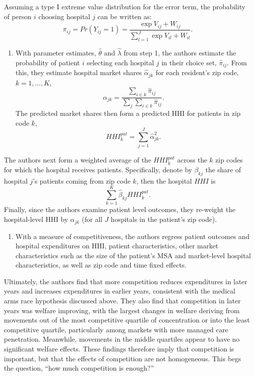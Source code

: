 \documentclass[
  letterpaper,
  DIV=11,
  numbers=noendperiod]{scrreport}
\providecommand{\tightlist}{%
  \setlength{\itemsep}{0pt}\setlength{\parskip}{0pt}}\usepackage{longtable,booktabs,array}
\theoremstyle{definition}
\theoremstyle{remark}
\begin{document}
Assuming a type I extreme value distribution for the error term, the
probability of person \(i\) choosing hospital \(j\) can be written as:
\[\pi_{ij} = Pr(Y_{ij}=1) = \frac{\exp{V_{ij} + W_{ij}}}{\sum_{l=1}^{J} \exp{V_{il} + W_{il}}}.\]

\begin{enumerate}
\def\labelenumi{\arabic{enumi}.}
\setcounter{enumi}{1}
\tightlist
\item
  With parameter estimates, \(\hat{\theta}\) and \(\hat{\lambda}\) from
  step 1, the authors estimate the probability of patient \(i\)
  selecting each hospital \(j\) in their choice set, \(\hat{\pi}_{ij}\).
  From this, they estimate hospital market shares \(\hat{\alpha}_{jk}\)
  for each resident's zip code, \(k=1,...,K\),
  \[\hat{\alpha}_{jk} = \frac{\sum_{i \in k} \hat{\pi}_{ij}}{\sum_{j} \sum_{i \in k} \hat{\pi}_{ij}}.\]
  The predicted market shares then form a predicted HHI for patients in
  zip code \(k\),
  \[HHI_{k}^{pat} = \sum_{j=1}^{J}\hat{\alpha}_{jk}^{2}.\]
\end{enumerate}

The authors next form a weighted average of the \(HHI_{k}^{pat}\) across
the \(k\) zip codes for which the hospital receives patients.
Specifically, denote by \(\beta_{kj}\) the share of hospital \(j\)'s
patients coming from zip code \(k\), then the hospital \(HHI\) is
\[\sum_{k=1}^{K} \hat{\beta}_{kj} HHI_{k}^{pat}.\] Finally, since the
authors examine patient level outcomes, they re-weight the
hospital-level HHI by \(\alpha_{jk}\) (for all \(J\) hospitals in the
patient's zip code).

\begin{enumerate}
\def\labelenumi{\arabic{enumi}.}
\setcounter{enumi}{2}
\tightlist
\item
  With a measure of competitiveness, the authors regress patient
  outcomes and hospital expenditures on HHI, patient characteristics,
  other market characteristics such as the size of the patient's MSA and
  market-level hospital characteristics, as well as zip code and time
  fixed effects.
\end{enumerate}

Ultimately, the authors find that more competition reduces expenditures
in later years and increases expenditures in earlier years, consistent
with the medical arms race hypothesis discussed above. They also find
that competition in later years was welfare improving, with the largest
changes in welfare deriving from movements out of the most competitive
quartile of concentration or into the least competitive quartile,
particularly among markets with more managed care penetration.
Meanwhile, movements in the middle quartiles appear to have no
significant welfare effects. These findings therefore imply that
competition is important, but that the effects of competition are not
homogeneous. This begs the question, ``how much competition is enough?''
\end{document}
